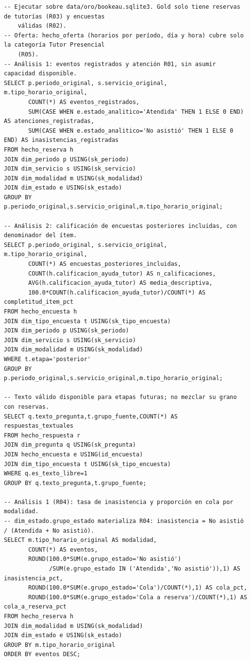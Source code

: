 \documentclass[11pt,letterpaper]{article}
\begin{document}
\begingroup\footnotesize\begin{verbatim}
-- Ejecutar sobre data/oro/bookeau.sqlite3. Gold solo tiene reservas de tutorías (R03) y encuestas 
    válidas (R02).
-- Oferta: hecho_oferta (horarios por período, día y hora) cubre solo la categoría Tutor Presencial 
    (R05).
-- Análisis 1: eventos registrados y atención R01, sin asumir capacidad disponible.
SELECT p.periodo_original, s.servicio_original, m.tipo_horario_original,
       COUNT(*) AS eventos_registrados,
       SUM(CASE WHEN e.estado_analitico='Atendida' THEN 1 ELSE 0 END) AS atenciones_registradas,
       SUM(CASE WHEN e.estado_analitico='No asistió' THEN 1 ELSE 0 END) AS inasistencias_registradas
FROM hecho_reserva h
JOIN dim_periodo p USING(sk_periodo)
JOIN dim_servicio s USING(sk_servicio)
JOIN dim_modalidad m USING(sk_modalidad)
JOIN dim_estado e USING(sk_estado)
GROUP BY p.periodo_original,s.servicio_original,m.tipo_horario_original;

-- Análisis 2: calificación de encuestas posteriores incluidas, con denominador del ítem.
SELECT p.periodo_original, s.servicio_original, m.tipo_horario_original,
       COUNT(*) AS encuestas_posteriores_incluidas,
       COUNT(h.calificacion_ayuda_tutor) AS n_calificaciones,
       AVG(h.calificacion_ayuda_tutor) AS media_descriptiva,
       100.0*COUNT(h.calificacion_ayuda_tutor)/COUNT(*) AS completitud_item_pct
FROM hecho_encuesta h
JOIN dim_tipo_encuesta t USING(sk_tipo_encuesta)
JOIN dim_periodo p USING(sk_periodo)
JOIN dim_servicio s USING(sk_servicio)
JOIN dim_modalidad m USING(sk_modalidad)
WHERE t.etapa='posterior'
GROUP BY p.periodo_original,s.servicio_original,m.tipo_horario_original;

-- Texto válido disponible para etapas futuras; no mezclar su grano con reservas.
SELECT q.texto_pregunta,t.grupo_fuente,COUNT(*) AS respuestas_textuales
FROM hecho_respuesta r
JOIN dim_pregunta q USING(sk_pregunta)
JOIN hecho_encuesta e USING(id_encuesta)
JOIN dim_tipo_encuesta t USING(sk_tipo_encuesta)
WHERE q.es_texto_libre=1
GROUP BY q.texto_pregunta,t.grupo_fuente;

-- Análisis 1 (R04): tasa de inasistencia y proporción en cola por modalidad.
-- dim_estado.grupo_estado materializa R04: inasistencia = No asistió / (Atendida + No asistió).
SELECT m.tipo_horario_original AS modalidad,
       COUNT(*) AS eventos,
       ROUND(100.0*SUM(e.grupo_estado='No asistió')
             /SUM(e.grupo_estado IN ('Atendida','No asistió')),1) AS inasistencia_pct,
       ROUND(100.0*SUM(e.grupo_estado='Cola')/COUNT(*),1) AS cola_pct,
       ROUND(100.0*SUM(e.grupo_estado='Cola a reserva')/COUNT(*),1) AS cola_a_reserva_pct
FROM hecho_reserva h
JOIN dim_modalidad m USING(sk_modalidad)
JOIN dim_estado e USING(sk_estado)
GROUP BY m.tipo_horario_original
ORDER BY eventos DESC;


\end{verbatim}
\end{document}
